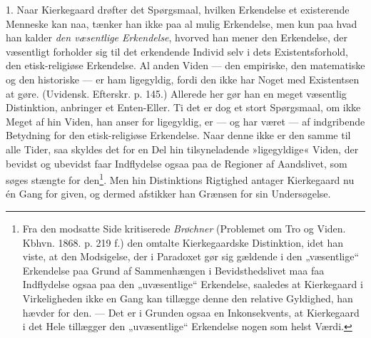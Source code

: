 \documentclass[12pt,a4paper,openany]{book}
\newcommand{\opage}[1]{\marginnote{\footnotesize\textit{[#1]}}}
\begin{document}
1. Naar Kierkegaard drøfter det Spørgsmaal, hvilken
Erkendelse et existerende Menneske kan naa, tænker han
ikke paa al mulig Erkendelse, men kun paa hvad han
kalder \textit{den væsentlige Erkendelse}, hvorved han mener den
Erkendelse, der væsentligt forholder sig til det erkendende
Individ selv i dets Existentsforhold, den etisk-religiøse
Erkendelse. Al anden Viden --- den empiriske, den
matematiske og den historiske --- er ham ligegyldig, fordi
den ikke har Noget med Existentsen at gøre. (Uvidensk.
Efterskr. p. 145.) Allerede her gør han en meget væsentlig
Distinktion, anbringer et Enten-Eller. Ti det er dog
et stort Spørgsmaal, om ikke Meget af hin Viden, han
anser for ligegyldig, er --- og har været --- af indgribende
Betydning for den etisk-religiøse Erkendelse. Naar denne
ikke er den samme til alle Tider, saa skyldes det for en
Del hin tilsyneladende »ligegyldige« Viden, der bevidst
og ubevidst faar Indflydelse ogsaa paa de Regioner af
\opage{59}Aandslivet, som søges stængte for den\footnote{Fra den modsatte Side kritiserede \textit{Brøchner} (Problemet om Tro og Viden. Kbhvn. 1868. p. 219 f.) den omtalte Kierkegaardske Distinktion, idet han viste, at den Modsigelse, der i Paradoxet gør sig gældende i den „væsentlige“ Erkendelse paa Grund af Sammenhængen i Bevidsthedslivet maa faa Indflydelse ogsaa paa den „uvæsentlige“ Erkendelse, saaledes at Kierkegaard i Virkeligheden ikke en Gang kan tillægge denne den relative Gyldighed, han hævder for den. --- Det er i Grunden ogsaa en Inkonsekvents, at Kierkegaard i det Hele tillægger den „uvæsentlige“ Erkendelse nogen som helst Værdi.}. Men hin
Distinktions Rigtighed antager Kierkegaard nu én Gang
for given, og dermed afstikker han Grænsen for sin
Undersøgelse.
\end{document}
